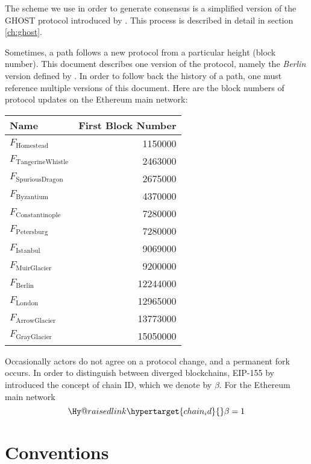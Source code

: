 \documentclass[9pt,oneside]{amsart}
\makeatletter
\newcommand{\linkdest}[1]{\Hy@raisedlink{\hypertarget{#1}{}}}
\makeatother
\begin{document}
\begin{multicols}{2}
The scheme we use in order to generate consensus is a simplified version of the GHOST protocol introduced by \cite{cryptoeprint:2013:881}. This process is described in detail in section \ref{ch:ghost}.

Sometimes, a path follows a new protocol from a particular height (block number).
This document describes one version of the protocol, namely the \textit{Berlin} version defined by \cite{BeikoBerlin}.
In order to follow back the history of a path, one must reference multiple versions of this document.
Here are the block numbers of protocol updates on the Ethereum main network:
\par
\begin{center}
\begin{tabular}{lr}
\toprule
Name & First Block Number \\
\midrule
$F_{\mathrm{Homestead}}$         &  1150000 \\
$F_{\mathrm{Tangerine Whistle}}$ &  2463000 \\
$F_{\mathrm{Spurious Dragon}}$   &  2675000 \\
$F_{\mathrm{Byzantium}}$         &  4370000 \\
$F_{\mathrm{Constantinople}}$    &  7280000 \\
$F_{\mathrm{Petersburg}}$        &  7280000 \\
$F_{\mathrm{Istanbul}}$          &  9069000 \\
$F_{\mathrm{Muir Glacier}}$      &  9200000 \\
$F_{\mathrm{Berlin}}$            & 12244000 \\
$F_{\mathrm{London}}$            & 12965000 \\
$F_{\mathrm{Arrow Glacier}}$     & 13773000 \\
$F_{\mathrm{Gray Glacier}}$      & 15050000 \\
\bottomrule
\end{tabular}
\end{center}
\par

Occasionally actors do not agree on a protocol change, and a permanent fork occurs.
In order to distinguish between diverged blockchains, EIP-155 by \cite{EIP-155} introduced the concept of chain ID, which we denote by $\beta$.
For the Ethereum main network
\begin{equation}
  \linkdest{chain_id}
  \beta = 1
\end{equation}

\section{Conventions}\label{ch:conventions}


\end{multicols}
\end{document}
